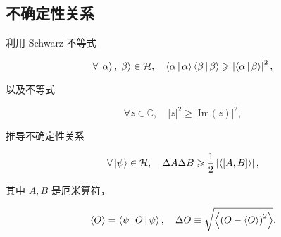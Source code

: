 \subsection{不确定性关系}

\begin{example}

利用 Schwarz 不等式

\begin{equation}
\forall \Ket{\alpha},\Ket{\beta} \in \mathcal{H},\quad
\Braket{\alpha | \alpha} \Braket{\beta | \beta} \geqslant \left|\Braket{\alpha | \beta} \right|^2,
\end{equation}

以及不等式

\begin{equation}
\forall z \in \mathbb{C},\quad \left|z \right|^2 \geqslant \left|\mathrm{Im}(z) \right|^2,
\end{equation}

推导不确定性关系

\begin{equation}
\forall \ket{\psi} \in \mathcal{H},\quad
\Delta A \Delta B
\geqslant \frac{1 }{2 } \left|\Braket{\left[A , B \right]} \right|,
\end{equation}

其中 $A,B $ 是厄米算符，

\begin{equation}
\Braket{O} = \Braket{\psi | O | \psi},\quad
\Delta O \equiv \sqrt{\Braket{\left(O - \Braket{O} \right)^2}}.
\end{equation}

\end{example}

